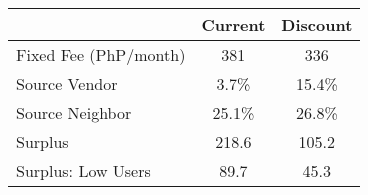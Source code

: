 \begin{tabular}{lcc}
\hline
& Current & Discount \\
\hline
\hline
Fixed Fee (PhP/month) &381&336\\
Source Vendor &3.7\% &15.4\% \\
Source Neighbor &25.1\% &26.8\% \\
 Surplus  &218.6&105.2 \\
 Surplus: Low Users  &89.7&45.3 \\
\hline
\end{tabular}
